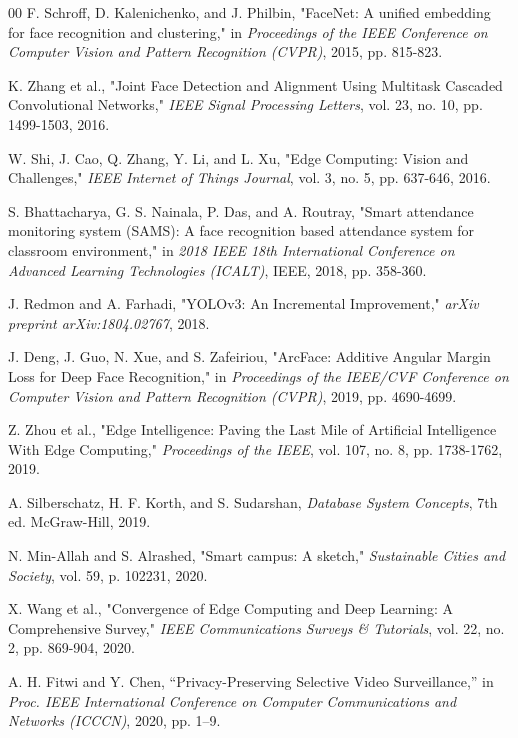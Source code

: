 \documentclass[conference]{IEEEtran}
\begin{document}
\begin{thebibliography}{00}
 F. Schroff, D. Kalenichenko, and J. Philbin, "FaceNet: A unified embedding for face recognition and clustering," in \textit{Proceedings of the IEEE Conference on Computer Vision and Pattern Recognition (CVPR)}, 2015, pp. 815-823.

 K. Zhang et al., "Joint Face Detection and Alignment Using Multitask Cascaded Convolutional Networks," \textit{IEEE Signal Processing Letters}, vol. 23, no. 10, pp. 1499-1503, 2016.


 W. Shi, J. Cao, Q. Zhang, Y. Li, and L. Xu, "Edge Computing: Vision and Challenges," \textit{IEEE Internet of Things Journal}, vol. 3, no. 5, pp. 637-646, 2016.

 S. Bhattacharya, G. S. Nainala, P. Das, and A. Routray, "Smart attendance monitoring system (SAMS): A face recognition based attendance system for classroom environment," in \textit{2018 IEEE 18th International Conference on Advanced Learning Technologies (ICALT)}, IEEE, 2018, pp. 358-360.

 J. Redmon and A. Farhadi, "YOLOv3: An Incremental Improvement," \textit{arXiv preprint arXiv:1804.02767}, 2018.

 J. Deng, J. Guo, N. Xue, and S. Zafeiriou, "ArcFace: Additive Angular Margin Loss for Deep Face Recognition," in \textit{Proceedings of the IEEE/CVF Conference on Computer Vision and Pattern Recognition (CVPR)}, 2019, pp. 4690-4699.

 Z. Zhou et al., "Edge Intelligence: Paving the Last Mile of Artificial Intelligence With Edge Computing," \textit{Proceedings of the IEEE}, vol. 107, no. 8, pp. 1738-1762, 2019.

 A. Silberschatz, H. F. Korth, and S. Sudarshan, \textit{Database System Concepts}, 7th ed. McGraw-Hill, 2019.

 N. Min-Allah and S. Alrashed, "Smart campus: A sketch," \textit{Sustainable Cities and Society}, vol. 59, p. 102231, 2020.

 X. Wang et al., "Convergence of Edge Computing and Deep Learning: A Comprehensive Survey," \textit{IEEE Communications Surveys \& Tutorials}, vol. 22, no. 2, pp. 869-904, 2020.

 A. H. Fitwi and Y. Chen, ``Privacy-Preserving Selective Video Surveillance,'' in \textit{Proc. IEEE International Conference on Computer Communications and Networks (ICCCN)}, 2020, pp. 1--9.


\end{thebibliography}
\end{document}
